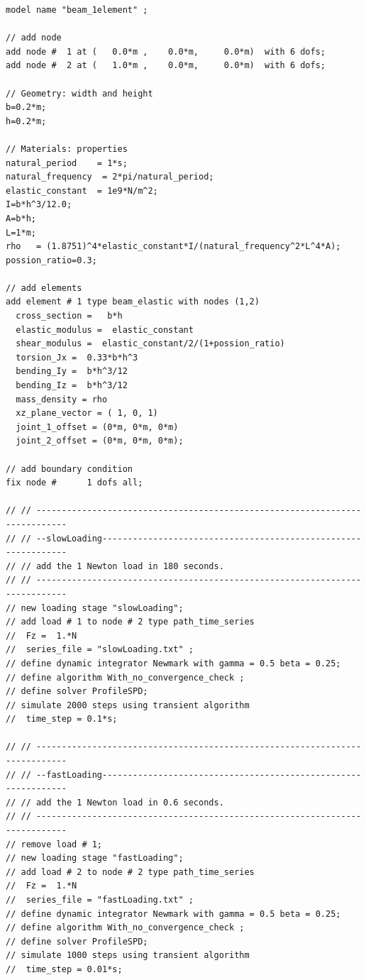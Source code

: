 \begin{lstlisting}
model name "beam_1element" ;

// add node
add node #  1 at (   0.0*m ,    0.0*m,     0.0*m)  with 6 dofs;
add node #  2 at (   1.0*m ,    0.0*m,     0.0*m)  with 6 dofs;
  
// Geometry: width and height
b=0.2*m;
h=0.2*m;

// Materials: properties
natural_period    = 1*s;        
natural_frequency  = 2*pi/natural_period;
elastic_constant  = 1e9*N/m^2; 
I=b*h^3/12.0;
A=b*h;
L=1*m;
rho   = (1.8751)^4*elastic_constant*I/(natural_frequency^2*L^4*A);
possion_ratio=0.3;

// add elements
add element # 1 type beam_elastic with nodes (1,2) 
  cross_section =   b*h 
  elastic_modulus =  elastic_constant
  shear_modulus =  elastic_constant/2/(1+possion_ratio)
  torsion_Jx =  0.33*b*h^3
  bending_Iy =  b*h^3/12
  bending_Iz =  b*h^3/12
  mass_density = rho
  xz_plane_vector = ( 1, 0, 1) 
  joint_1_offset = (0*m, 0*m, 0*m) 
  joint_2_offset = (0*m, 0*m, 0*m);

// add boundary condition
fix node #      1 dofs all;

// // ----------------------------------------------------------------------------
// // --slowLoading---------------------------------------------------------------
// // add the 1 Newton load in 180 seconds. 
// // ----------------------------------------------------------------------------
// new loading stage "slowLoading";
// add load # 1 to node # 2 type path_time_series 
//  Fz =  1.*N
//  series_file = "slowLoading.txt" ;
// define dynamic integrator Newmark with gamma = 0.5 beta = 0.25;
// define algorithm With_no_convergence_check ;
// define solver ProfileSPD;
// simulate 2000 steps using transient algorithm 
//  time_step = 0.1*s;

// // ----------------------------------------------------------------------------
// // --fastLoading---------------------------------------------------------------
// // add the 1 Newton load in 0.6 seconds.
// // ----------------------------------------------------------------------------
// remove load # 1;
// new loading stage "fastLoading";
// add load # 2 to node # 2 type path_time_series 
//  Fz =  1.*N
//  series_file = "fastLoading.txt" ;
// define dynamic integrator Newmark with gamma = 0.5 beta = 0.25;
// define algorithm With_no_convergence_check ;
// define solver ProfileSPD;
// simulate 1000 steps using transient algorithm 
//  time_step = 0.01*s;


\end{lstlisting}
